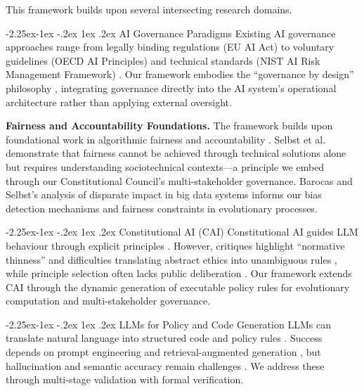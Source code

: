 \documentclass[manuscript,screen,review,anonymous,9pt]{acmart}
\makeatletter
\renewcommand\subsection{\@startsection{subsection}{2}{\z@}%
  {-2.25ex\@plus -1ex \@minus -.2ex}%
  {1ex \@plus .2ex}%
  {\normalfont\large\bfseries}}
\makeatother
\begin{document}
This framework builds upon several intersecting research domains.

\subsection{AI Governance Paradigms}
Existing AI governance approaches range from legally binding regulations (EU AI Act) to voluntary guidelines (OECD AI Principles) and technical standards (NIST AI Risk Management Framework) \cite{Wynants2025ETHICAL, WorldBank2024AIGovernance, CambridgeUP2024CorporateGovernance}. Our framework embodies the ``governance by design'' philosophy \cite{Engin2025AdaptiveAIGovernance}, integrating governance directly into the AI system's operational architecture rather than applying external oversight.

\textbf{Fairness and Accountability Foundations.} The framework builds upon foundational work in algorithmic fairness and accountability \cite{Selbst2019FairnessAccountability, Barocas2016BigDataDisparate}. Selbst et al. demonstrate that fairness cannot be achieved through technical solutions alone but requires understanding sociotechnical contexts---a principle we embed through our Constitutional Council's multi-stakeholder governance. Barocas and Selbst's analysis of disparate impact in big data systems informs our bias detection mechanisms and fairness constraints in evolutionary processes.

\subsection{Constitutional AI (CAI)}
Constitutional AI guides LLM behaviour through explicit principles \cite{Bai2025ConstitutionalAI}. However, critiques highlight ``normative thinness'' and difficulties translating abstract ethics into unambiguous rules \cite{DigiCon2025ConstitutionalAIThin, ChaconMenke2025CAISmallLLMs}, while principle selection often lacks public deliberation \cite{Hwang2025PublicCAI}. Our framework extends CAI through the dynamic generation of executable policy rules for evolutionary computation and multi-stakeholder governance.

\subsection{LLMs for Policy and Code Generation}
LLMs can translate natural language into structured code and policy rules \cite{Almulla2024EmergenceLLMPolicy, ResearchGate2025AutoPAC, Li2025VeriCoder}. Success depends on prompt engineering and retrieval-augmented generation \cite{AnalyticsVidhya2024PromptingTechniques, arXiv2025FutureWorkRAG}, but hallucination and semantic accuracy remain challenges \cite{AAAI2025CodeHalu, Taeihagh2025Governing}. We address these through multi-stage validation with formal verification.
\end{document}
